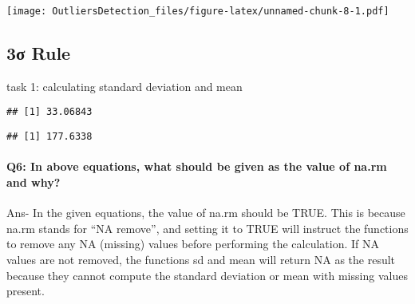 \documentclass[
]{article}
\newenvironment{Shaded}{\begin{snugshade}}{\end{snugshade}}
\newcommand{\AttributeTok}[1]{\textcolor[rgb]{0.13,0.29,0.53}{#1}}
\newcommand{\ConstantTok}[1]{\textcolor[rgb]{0.56,0.35,0.01}{#1}}
\newcommand{\FunctionTok}[1]{\textcolor[rgb]{0.13,0.29,0.53}{\textbf{#1}}}
\newcommand{\NormalTok}[1]{#1}
\newcommand{\OtherTok}[1]{\textcolor[rgb]{0.56,0.35,0.01}{#1}}
\newcommand{\SpecialCharTok}[1]{\textcolor[rgb]{0.81,0.36,0.00}{\textbf{#1}}}
\begin{document}
\texttt{[image: OutliersDetection\_files/figure-latex/unnamed-chunk-8-1.pdf]}

\hypertarget{ux3c3-rule}{%
\subsection{3σ Rule}\label{ux3c3-rule}}

task 1: calculating standard deviation and mean

\begin{Shaded}
\end{Shaded}

\begin{verbatim}
## [1] 33.06843
\end{verbatim}

\begin{Shaded}
\end{Shaded}

\begin{verbatim}
## [1] 177.6338
\end{verbatim}

\hypertarget{q6-in-above-equations-what-should-be-given-as-the-value-of-na.rm-and-why}{%
\paragraph{Q6: In above equations, what should be given as the value of
na.rm and
why?}\label{q6-in-above-equations-what-should-be-given-as-the-value-of-na.rm-and-why}}

Ans- In the given equations, the value of na.rm should be TRUE. This is
because na.rm stands for ``NA remove'', and setting it to TRUE will
instruct the functions to remove any NA (missing) values before
performing the calculation. If NA values are not removed, the functions
sd and mean will return NA as the result because they cannot compute the
standard deviation or mean with missing values present.
\end{document}
